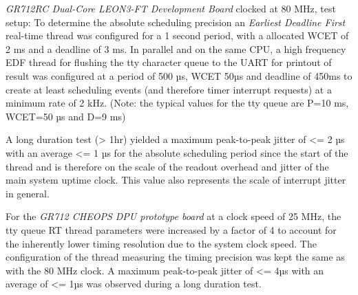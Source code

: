 \emph{GR712RC Dual-Core LEON3-FT Development Board} clocked at 80 MHz, test setup:
To determine the absolute scheduling precision an \emph{Earliest Deadline First}
real-time thread was configured for a 1 second period, with a
allocated WCET of 2 ms and a deadline of 3 ms. In parallel and on the same
CPU, a high frequency EDF thread for flushing the tty character queue to
the UART for printout of result was configured at a period of 500 µs, WCET 50µs
and deadline of 450ms to create at least scheduling events (and therefore timer
interrupt requests) at a minimum rate of 2 kHz.
(Note: the typical values for the tty queue are P=10 ms, WCET=50 µs and D=9 ms)

A long duration test (> 1hr) yielded a maximum peak-to-peak jitter of <= 2 µs with
an average <= 1 µs for the absolute scheduling period since the start of the thread
and is therefore
on the scale of the readout overhead and jitter of the main system uptime clock.
This value also represents the scale of interrupt jitter in general.

For the \emph{GR712 CHEOPS DPU prototype board} at a clock speed of
25 MHz, the tty queue RT thread parameters were increased by a factor of 4
to account for the inherently lower timing resolution due to the system clock speed.
The configuration of the thread measuring the timing precision was kept the same
as with the 80 MHz clock.
A maximum peak-to-peak jitter of <= 4µs with an average of <= 1µs was observed
during a long duration test.


